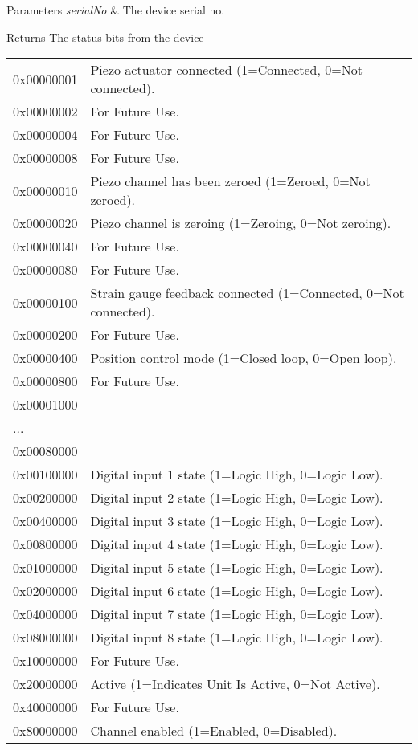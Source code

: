 \begin{DoxyParams}{Parameters}
{\em serial\+No} & The device serial no. \\
\hline
\end{DoxyParams}
\begin{DoxyReturn}{Returns}
The status bits from the device \tabulinesep=1mm
\begin{longtabu} spread 0pt [c]{*2{|X[-1]}|}
\hline
0x00000001&Piezo actuator connected (1=Connected, 0=Not connected). \\
0x00000002&For Future Use. \\
0x00000004&For Future Use. \\
0x00000008&For Future Use. \\
0x00000010&Piezo channel has been zeroed (1=Zeroed, 0=Not zeroed). \\
0x00000020&Piezo channel is zeroing (1=Zeroing, 0=Not zeroing). \\
0x00000040&For Future Use. \\
0x00000080&For Future Use. \\
0x00000100&Strain gauge feedback connected (1=Connected, 0=Not connected). \\
0x00000200&For Future Use. \\
0x00000400&Position control mode (1=Closed loop, 0=Open loop). \\
0x00000800&For Future Use. \\
0x00001000&\\
...&\\
0x00080000&\\
0x00100000&Digital input 1 state (1=Logic High, 0=Logic Low). \\
0x00200000&Digital input 2 state (1=Logic High, 0=Logic Low). \\
0x00400000&Digital input 3 state (1=Logic High, 0=Logic Low). \\
0x00800000&Digital input 4 state (1=Logic High, 0=Logic Low). \\
0x01000000&Digital input 5 state (1=Logic High, 0=Logic Low). \\
0x02000000&Digital input 6 state (1=Logic High, 0=Logic Low). \\
0x04000000&Digital input 7 state (1=Logic High, 0=Logic Low). \\
0x08000000&Digital input 8 state (1=Logic High, 0=Logic Low). \\
0x10000000&For Future Use. \\
0x20000000&Active (1=Indicates Unit Is Active, 0=Not Active). \\
0x40000000&For Future Use. \\
0x80000000&Channel enabled (1=Enabled, 0=Disabled). \\
\end{longtabu}



\end{DoxyReturn}
